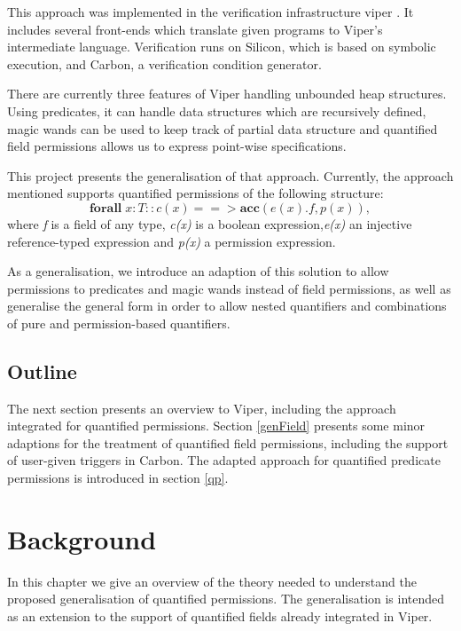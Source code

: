 \documentclass[12pt]{article}
\begin{document}
This approach was implemented in the verification infrastructure viper \cite{viper}. It includes several front-ends which translate given programs to Viper's intermediate language. Verification runs on Silicon, which is based on symbolic execution, and Carbon, a verification condition generator.

There are currently three features of Viper handling unbounded heap structures. Using predicates, it can handle data structures which are recursively defined, magic wands \cite{magicwand} can be used to keep track of partial data structure and quantified field permissions \cite{isc} allows us to express point-wise specifications. 

This project presents the generalisation of that approach. Currently, the approach mentioned supports quantified permissions of the following structure:
\begin{equation}
	\mathbf{forall} \; x:T :: c(x) ==>\mathbf{acc}( e(x).f, p(x) ) ,
\end{equation}
where {\it f} is a field of any type, {\it c(x)} is  a boolean expression,{\it e(x)} an injective reference-typed expression and {\it p(x)} a permission expression.

As a generalisation, we introduce an adaption of this solution to allow permissions to predicates\cite{predicates} and magic wands\cite{magicwand} instead of field permissions, as well as generalise the general form in order to allow nested quantifiers and combinations of pure and permission-based quantifiers.

\subsection{Outline}

The next section presents an overview to Viper, including the approach integrated for quantified permissions. Section \ref{genField} presents some minor adaptions for the treatment of quantified field permissions, including the support of user-given triggers in Carbon. The adapted approach for quantified predicate permissions is introduced in section \ref{qp}.


\section{Background}
\label{background}
In this chapter we give an overview of the theory needed to understand the proposed generalisation of quantified permissions. The generalisation is intended as an extension to the support of quantified fields already integrated in Viper\cite{viper}\cite{viper2014}.
\end{document}
